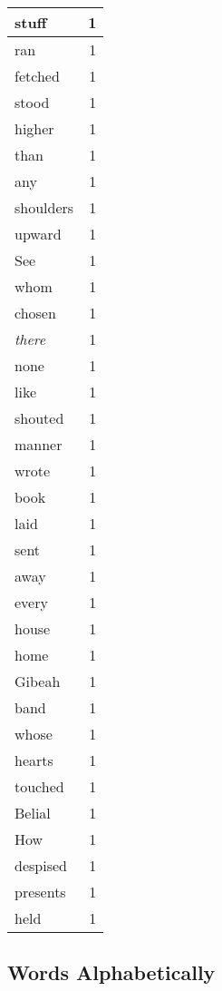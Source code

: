 \begin{center}
\begin{longtable}{l|r}
stuff & 1 \\ \hline
ran & 1 \\ \hline
fetched & 1 \\ \hline
stood & 1 \\ \hline
higher & 1 \\ \hline
than & 1 \\ \hline
any & 1 \\ \hline
shoulders & 1 \\ \hline
upward & 1 \\ \hline
See & 1 \\ \hline
whom & 1 \\ \hline
chosen & 1 \\ \hline
\emph{there} & 1 \\ \hline
none & 1 \\ \hline
like & 1 \\ \hline
shouted & 1 \\ \hline
manner & 1 \\ \hline
wrote & 1 \\ \hline
book & 1 \\ \hline
laid & 1 \\ \hline
sent & 1 \\ \hline
away & 1 \\ \hline
every & 1 \\ \hline
house & 1 \\ \hline
home & 1 \\ \hline
Gibeah & 1 \\ \hline
band & 1 \\ \hline
whose & 1 \\ \hline
hearts & 1 \\ \hline
touched & 1 \\ \hline
Belial & 1 \\ \hline
How & 1 \\ \hline
despised & 1 \\ \hline
presents & 1 \\ \hline
held & 1 \\ \hline
\end{longtable}
\end{center}



\normalsize



\subsection{Words Alphabetically}

